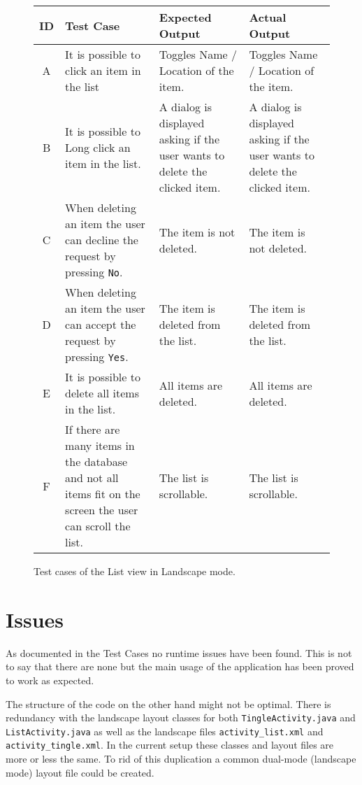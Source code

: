 \begin{figure}[H]
	\renewcommand*{\arraystretch}{1.5} %
	\begin{tabular}{| c | p{3.5cm} | p{3.5cm} | p{3.5cm} |}
		\hline
		{\textbf{ID} } & {\textbf{Test Case} } & {\textbf{Expected Output}} & {\textbf {Actual Output}} \\\hline\hline
		A &	It is possible to click an item in the list & Toggles Name / Location of the item.  & Toggles Name / Location of the item. \\ \hline
		B & It is possible to Long click an item in the list. & A dialog is displayed asking if the user wants to delete the clicked item. & A dialog is displayed asking if the user wants to delete the clicked item. \\ \hline
		C & When deleting an item the user can decline the request by pressing \texttt{No}. & The item is not deleted. & The item is not deleted. \\ \hline
		D & When deleting an item the user can accept the request by pressing \texttt{Yes}. & The item is deleted from the list. & The item is deleted from the list. \\ \hline
		E & It is possible to delete all items in the list. & All items are deleted. & All items are deleted. \\ \hline
		F & If there are many items in the database and not all items fit on the screen the user can scroll the list. & The list is scrollable. & The list is scrollable. \\ \hline
	\end{tabular}
	
	\caption{Test cases of the List view in Landscape mode.}
	\label{tab:test-cases-list-landscape}
\end{figure}

\section{Issues}

As documented in the Test Cases no runtime issues have been found. This is not to say that there are none but the main usage of the application has been proved to work as expected.

The structure of the code on the other hand might not be optimal. There is redundancy with the landscape layout classes for both \texttt{TingleActivity.java} and \texttt{ListActivity.java} as well as the landscape files \texttt{activity\_list.xml} and \texttt{activity\_tingle.xml}. In the current setup these classes and layout files are more or less the same. To rid of this duplication a common dual-mode (landscape mode) layout file could be created.